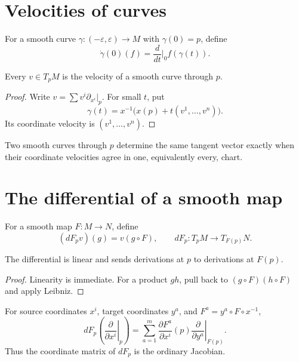 \section{Velocities of curves}
\begin{definition}\label{def:vii04-curve-velocity}
For a smooth curve \(\gamma:(-\varepsilon,\varepsilon)\to M\) with \(\gamma(0)=p\), define
\[
\dot\gamma(0)(f)=\frac{d}{dt}\bigg|_0 f(\gamma(t)).
\]
\end{definition}

\begin{theorem}\label{thm:vii04-curve-realization}
Every \(v\in T_pM\) is the velocity of a smooth curve through \(p\).
\end{theorem}
\begin{proof}
Write \(v=\sum v^i\partial_{x^i}|_p\). For small \(t\), put
\[
\gamma(t)=x^{-1}\bigl(x(p)+t(v^1,\dots,v^n)\bigr).
\]
Its coordinate velocity is \((v^1,\dots,v^n)\).
\end{proof}

\begin{corollary}\label{cor:vii04-curve-model}
Two smooth curves through \(p\) determine the same tangent vector exactly when their coordinate velocities agree in one, equivalently every, chart.
\end{corollary}

\section{The differential of a smooth map}
\begin{definition}\label{def:vii04-differential}
For a smooth map \(F:M\to N\), define
\[
(dF_pv)(g)=v(g\circ F),\qquad
dF_p:T_pM\to T_{F(p)}N.
\]
\end{definition}

\begin{proposition}\label{prop:vii04-differential-linear}
The differential is linear and sends derivations at \(p\) to derivations at \(F(p)\).
\end{proposition}
\begin{proof}
Linearity is immediate. For a product \(gh\), pull back to \((g\circ F)(h\circ F)\) and apply Leibniz.
\end{proof}

\begin{theorem}\label{thm:vii04-jacobian}
For source coordinates \(x^i\), target coordinates \(y^a\), and
\(F^a=y^a\circ F\circ x^{-1}\),
\[
dF_p\left(\left.\frac{\partial}{\partial x^i}\right|_p\right)
=
\sum_{a=1}^m
\frac{\partial F^a}{\partial x^i}(p)
\left.\frac{\partial}{\partial y^a}\right|_{F(p)}.
\]
Thus the coordinate matrix of \(dF_p\) is the ordinary Jacobian.
\end{theorem}

